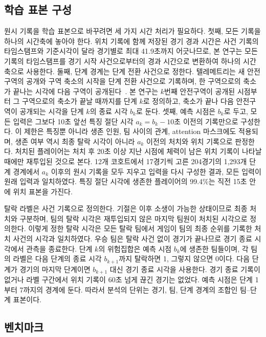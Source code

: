 \subsection{학습 표본 구성}
\label{sec:data:samples}

원시 기록을 학습 표본으로 바꾸려면 세 가지 시간 처리가 필요하다.
첫째, 모든 기록을 하나의 시간축에 놓아야 한다.
위치 기록에 함께 저장된 경기 경과 시간은 사건 기록의 타임스탬프와 기준시각이 달라 경기별로 최대 41.9초까지 어긋나므로, 본 연구는 모든 기록의 타임스탬프를 경기 시작 사건으로부터의 경과 시간으로 변환하여 하나의 시간축으로 사용한다.
둘째, 단계 경계는 단계 전환 사건으로 정한다.
텔레메트리는 새 안전구역의 공개와 구역 축소의 시작을 단계 전환 사건으로 기록하며, 한 구역으로의 축소가 끝나는 시각에 다음 구역이 공개된다~\cite{PUBGAPI}.
본 연구는 $k$번째 안전구역이 공개된 시점부터 그 구역으로의 축소가 끝날 때까지를 단계 $k$로 정의하고, 축소가 끝나 다음 안전구역이 공개되는 시각을 단계 $k$의 종료 시각 $b_k$로 둔다.
셋째, 예측 시점은 $b_k$로 두고, 모든 입력은 그보다 10초 앞선 특징 절단 시각 $a_k=b_k-10$초 이전의 기록만으로 구성한다.
이 제한은 특징뿐 아니라 생존 인원, 팀 사이의 관계, attention 마스크에도 적용되며, 생존 여부 역시 최종 탈락 시각이 아니라 $a_k$ 이전의 처치와 위치 기록으로 판정한다.
처치된 플레이어는 처치 후 20초 이상 지난 시점에 체력이 남은 위치 기록이 나타날 때에만 재투입된 것으로 본다.
12개 코호트에서 17경기씩 고른 204경기의 1,293개 단계 경계에서 $a_k$ 이후의 원시 기록을 모두 지우고 입력을 다시 구성한 결과, 모든 입력이 원래 입력과 일치하였다.
특징 절단 시각에 생존한 플레이어의 99.4\%는 직전 15초 안에 위치 표본을 가진다.

탈락 라벨은 사건 기록으로 정의한다.
기절은 이후 소생이 가능한 상태이므로 최종 처치와 구분하며, 팀의 탈락 시각은 재투입되지 않은 마지막 팀원이 처치된 시각으로 정의한다.
이렇게 정한 탈락 시각은 모든 탈락 팀에서 게임이 팀의 최종 순위를 기록한 처치 사건의 시각과 일치하였다.
우승 팀은 탈락 사건 없이 경기가 끝나므로 경기 종료 시각에서 관측을 종료한다.
단계 $k$의 위험집합은 예측 시점 $b_k$에 생존한 팀들이며, 각 팀의 라벨은 다음 단계의 종료 시각 $b_{k+1}$까지 탈락하면 1, 그렇지 않으면 0이다.
다음 단계가 경기의 마지막 단계이면 $b_{k+1}$ 대신 경기 종료 시각을 사용한다.
경기 종료 기록이 없거나 라벨 구간에서 위치 기록이 60초 넘게 끊긴 경기는 없었다.
예측 시점은 단계 1부터 7까지의 경계에 둔다.
따라서 분석의 단위는 경기, 팀, 단계 경계의 조합인 팀--단계 표본이다.

\subsection{벤치마크}
\label{sec:data:benchmark}

